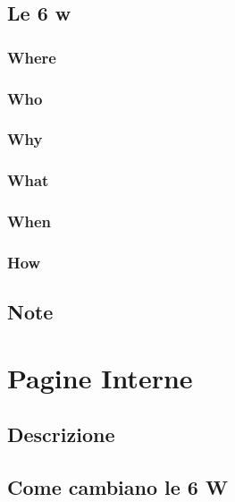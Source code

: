 \documentclass[a4paper, oneside, openany, dvipsnames, table]{article}
\begin{document}
	\subsection{Le 6 w}
		
		\subsubsection{Where}
			
		\subsubsection{Who}
			
		\subsubsection{Why}
			
		\subsubsection{What}
			
		\subsubsection{When}
			
		\subsubsection{How}
			
		\subsection{Note}
			
			


\newpage
\section{Pagine Interne}
	
	\subsection{Descrizione}
		
	\subsection{Come cambiano le 6 W}
		
	
	
	
\end{document}
